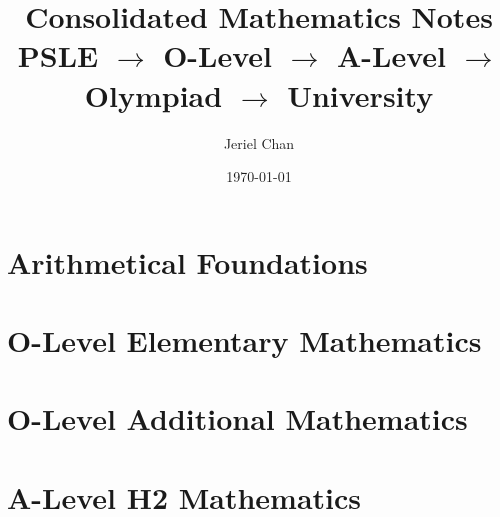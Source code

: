 \documentclass[11pt,a4paper]{article}
\title{\textbf{Consolidated Mathematics Notes}\\[0.5em]
  \Large PSLE $\to$ O-Level $\to$ A-Level $\to$ Olympiad $\to$ University}
\author{Jeriel Chan}
\date{\today}
\begin{document}
\maketitle
\tableofcontents
\newpage

\part{Arithmetical Foundations}






\part{O-Level Elementary Mathematics}







\part{O-Level Additional Mathematics}








\part{A-Level H2 Mathematics}








\end{document}
